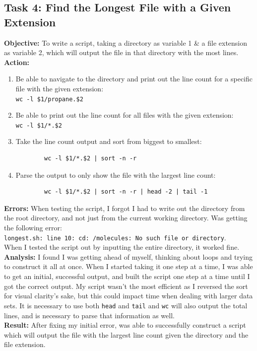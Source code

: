 \documentclass{article}
\begin{document}
\subsection{Task 4: Find the Longest File with a Given Extension}
%
\textbf{Objective:} To write a script, taking a directory as variable 1 \& a file extension as variable 2, which will output the file in that directory with the most lines.
\textbf{Action:}
\begin{enumerate}
    \item Be able to navigate to the directory and print out the line count for a specific file with the given extension:\\\verb|wc -l $1/propane.$2|
    \item Be able to print out the line count for all files with the given extension:\\\verb|wc -l $1/*.$2|
    \item Take the line count output and sort from biggest to smallest: 
    \begin{verbatim}
        wc -l $1/*.$2 | sort -n -r
    \end{verbatim}
    \item Parse the output to only show the file with the largest line count:
    \begin{verbatim}
        wc -l $1/*.$2 | sort -n -r | head -2 | tail -1
    \end{verbatim}
\end{enumerate}
\textbf{Errors:} When testing the script, I forgot I had to write out the directory from the root directory, and not just from the current working directory. Was getting the following error: \\\verb|longest.sh: line 10: cd: /molecules: No such file or directory|.\\
When I tested the script out by inputting the entire directory, it worked fine.
\textbf{Analysis:} I found I was getting ahead of myself, thinking about loops and trying to construct it all at once. When I started taking it one step at a time, I was able to get an initial, successful output, and built the script one step at a time until I got the correct output. My script wasn't the most efficient as I reversed the sort for visual clarity's sake, but this could impact time when dealing with larger data sets. It is necessary to use both \verb|head| and \verb|tail| and \verb|wc| will also output the total lines, and is necessary to parse that information as well.\\
\textbf{Result:} After fixing my initial error, was able to successfully construct a script which will output the file with the largest line count given the directory and the file extension.
%
\end{document}
